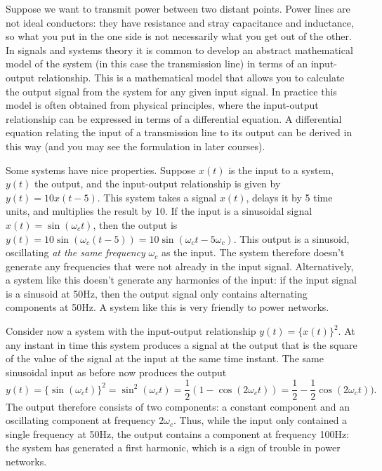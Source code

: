 \documentclass[10pt]{beamer}
\begin{document}
Suppose we want to transmit power between two distant points.  Power lines are not ideal conductors:  they have resistance and stray capacitance and inductance, so what you put in the one side is not necessarily what you get out of the other.  In signals and systems theory it is common to develop an abstract mathematical model of the system (in this case the transmission line) in terms of an input-output relationship.  This is a mathematical model that allows you to calculate the output signal from the system for any given input signal.  In practice this model is often obtained from physical principles, where the input-output relationship can be expressed in terms of a differential equation.  A differential equation relating the input of a transmission line to its output can be derived in this way (and you may see the formulation in later courses).

Some systems have nice properties.  Suppose $x(t)$ is the input to a system, $y(t)$ the output, and the input-output relationship is given by $y(t) = 10 x(t - 5)$.  This system takes a signal $x(t)$, delays it by 5 time units, and multiplies the result by 10.  If the input is a sinusoidal signal $x(t) = \sin(\omega_c t)$, then the output is $y(t) = 10 \sin(\omega_c (t-5)) = 10 \sin(\omega_c t - 5 \omega_c)$.  This output is a sinusoid, oscillating {\em at the same frequency} $\omega_c$ as the input.  The system therefore doesn't generate any frequencies that were not already in the input signal.  Alternatively, a system like this doesn't generate any harmonics of the input:  if the input signal is a sinusoid at 50Hz, then the output signal only contains alternating components at 50Hz.  A system like this is very friendly to power networks.

Consider now a system with the input-output relationship $y(t) = \{x(t)\}^2$.  At any instant in time this system produces a signal at the output that is the square of the value of the signal at the input at the same time instant.  The same sinusoidal input as before now produces the output 
\begin{equation*}
  y(t) = \{ \sin(\omega_c t) \}^2 = \sin^2(\omega_c t) = \frac{1}{2} (1 - \cos(2 \omega_c t)) = \frac{1}{2} - \frac{1}{2} \cos(2 \omega_c t)).
\end{equation*}
The output therefore consists of two components:  a constant component and an oscillating component at frequency $2 \omega_c$.  Thus, while the input only contained a single frequency at 50Hz, the output contains a component at frequency 100Hz:  the system has generated a first harmonic, which is a sign of trouble in power networks.
\end{document}
